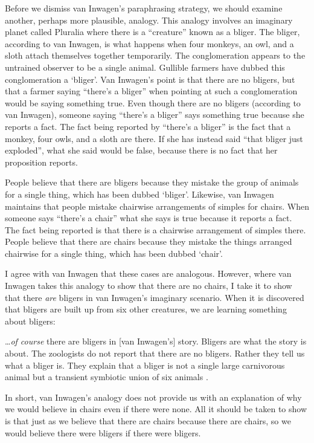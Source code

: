 \documentclass[11pt]{article}
\newenvironment{squote}{%
\begin{spacing}{1}
\begin{list}{}{%
    \setlength{\labelwidth}{0pt}%
    \rightmargin\leftmargin%
  }
\item\relax
}{%
\end{list}%
\end{spacing}
}
\begin{document}
\begin{spacing}{1.5}
Before we dismiss van Inwagen's paraphrasing strategy, we should
examine another, perhaps more plausible, analogy.  This analogy
involves an imaginary planet called Pluralia where there is a
``creature'' known as a bliger.  The bliger, according to van Inwagen,
is what happens when four monkeys, an owl, and a sloth attach
themselves together temporarily.  The conglomeration appears to the
untrained observer to be a single animal.  Gullible farmers have
dubbed this conglomeration a `bliger'.  Van Inwagen's point is that
there are no bligers, but that a farmer saying ``there's a bliger''
when pointing at such a conglomeration would be saying something true.
Even though there are no bligers (according to van Inwagen), someone
saying ``there's a bliger'' says something true because she reports a
fact.  The fact being reported by ``there's a bliger'' is the fact
that a monkey, four owls, and a sloth are there.  If she has instead
said ``that bliger just exploded'', what she said would be false,
because there is no fact that her proposition reports.

People believe that there are bligers because they mistake the group
of animals for a single thing, which has been dubbed `bliger'.
Likewise, van Inwagen maintains that people mistake chairwise
arrangements of simples for chairs.  When someone says ``there's a
chair'' what she says is true because it reports a fact.  The fact
being reported is that there is a chairwise arrangement of simples
there.  People believe that there are chairs because they mistake the
things arranged chairwise for a single thing, which has been dubbed
`chair'.

I agree with van Inwagen that these cases are analogous.  However,
where van Inwagen takes this analogy to show that there are no chairs,
I take it to show that there {\em are} bligers in van Inwagen's
imaginary scenario.  When it is discovered that bligers are built up
from six other creatures, we are learning something about bligers:

\begin{squote}
\ldots {\em of course} there are bligers in [van Inwagen's] story.
Bligers are what the story is about.  The zoologists do not report
that there are no bligers.  Rather they tell us what a bliger is.
They explain that a bliger is not a single large carnivorous animal
but a transient symbiotic union of six animals
\citep[704]{rosenberg1993}.
\end{squote}

In short, van Inwagen's analogy does not provide us with an
explanation of why we would believe in chairs even if there were
none.  All it should be taken to show is that just as we believe that
there are chairs because there are chairs, so we would believe there
were bligers if there were bligers.


\end{spacing}
\end{document}
